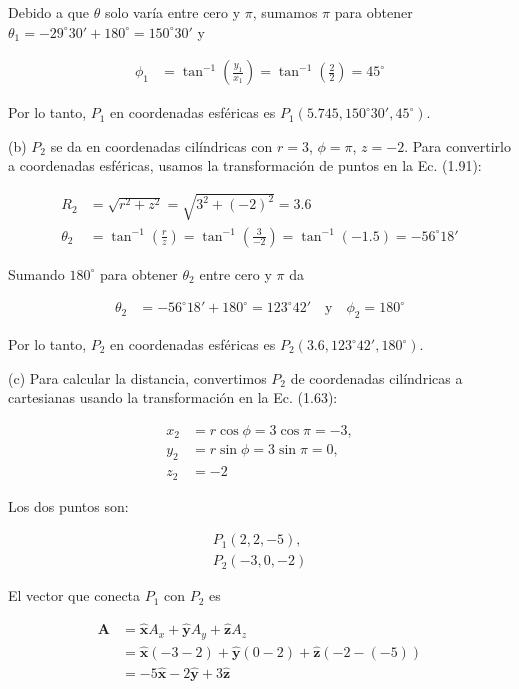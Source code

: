 \documentclass{book}
\begin{document}
Debido a que $\theta$ solo varía entre cero y $\pi$, sumamos $\pi$ para obtener $\theta_1 = -29^\circ 30' + 180^\circ = 150^\circ 30'$ y

\begin{align*}
\phi_1 &= \tan^{-1} \left( \frac{y_1}{x_1} \right) = \tan^{-1} \left( \frac{2}{2} \right) = 45^\circ
\end{align*}

Por lo tanto, $P_1$ en coordenadas esféricas es $P_1(5.745, 150^\circ 30', 45^\circ)$.

(b) $P_2$ se da en coordenadas cilíndricas con $r = 3$, $\phi = \pi$, $z = -2$. Para convertirlo a coordenadas esféricas, usamos la transformación de puntos en la Ec. (1.91):

\begin{align*}
R_2 &= \sqrt{r^2 + z^2} = \sqrt{3^2 + (-2)^2} = 3.6 \\
\theta_2 &= \tan^{-1} \left( \frac{r}{z} \right) = \tan^{-1} \left( \frac{3}{-2} \right) = \tan^{-1} (-1.5) = -56^\circ 18'
\end{align*}

Sumando $180^\circ$ para obtener $\theta_2$ entre cero y $\pi$ da

\begin{align*}
\theta_2 &= -56^\circ 18' + 180^\circ = 123^\circ 42' \quad \text{y} \quad \phi_2 = 180^\circ
\end{align*}

Por lo tanto, $P_2$ en coordenadas esféricas es $P_2(3.6, 123^\circ 42', 180^\circ)$.

(c) Para calcular la distancia, convertimos $P_2$ de coordenadas cilíndricas a cartesianas usando la transformación en la Ec. (1.63):

\begin{align*}
x_2 &= r \cos \phi = 3 \cos \pi = -3, \\
y_2 &= r \sin \phi = 3 \sin \pi = 0, \\
z_2 &= -2
\end{align*}

Los dos puntos son:

\begin{align*}
P_1(2, 2, -5), \\
P_2(-3, 0, -2)
\end{align*}

El vector que conecta $P_1$ con $P_2$ es

\begin{align*}
\mathbf{A} &= \mathbf{\hat{x}} A_x + \mathbf{\hat{y}} A_y + \mathbf{\hat{z}} A_z \\
&= \mathbf{\hat{x}} (-3 - 2) + \mathbf{\hat{y}} (0 - 2) + \mathbf{\hat{z}} (-2 - (-5)) \\
&= -5 \mathbf{\hat{x}} - 2 \mathbf{\hat{y}} + 3 \mathbf{\hat{z}}
\end{align*}
\end{document}
